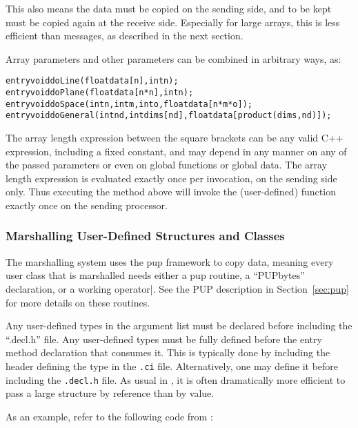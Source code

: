 This also means the data must be copied on the sending 
side, and to be kept must be copied again 
at the receive side.  Especially for large arrays, this 
is less efficient than messages, as described in the next section.

Array parameters and other parameters can be combined in arbitrary ways, as:
\begin{alltt}
  entry void doLine(float data[n],int n);
  entry void doPlane(float data[n*n],int n);
  entry void doSpace(int n,int m,int o,float data[n*m*o]);
  entry void doGeneral(int nd,int dims[nd],float data[product(dims,nd)]);
\end{alltt}
The array length expression between the square brackets can be 
any valid C++ expression, including a fixed constant, and may depend 
in any manner on any of the passed
parameters or even on global functions or global data.  The array length 
expression is evaluated exactly once per invocation, on the sending side only.
Thus executing the  method above will invoke the 
(user-defined)  function exactly once on the sending
processor.

\subsubsection{Marshalling User-Defined Structures and Classes}

The marshalling system uses the pup framework to copy data,
meaning every user class that is marshalled needs either a
pup routine, a ``PUPbytes'' declaration, or a working operator|.
See the PUP description in Section~\ref{sec:pup} for more details 
on these routines.

Any user-defined types in the argument list must be declared 
before including the ``.decl.h'' file.
Any user-defined types must be fully defined before the entry
method declaration that consumes it.  This is typically done by
including the header defining the type in the {\tt .ci} file.
Alternatively, one may define it before including the
{\tt .decl.h} file.  As usual in \CC, it is often dramatically
 more efficient to pass a large structure by reference than by value.

As an example, refer to the following code from :

